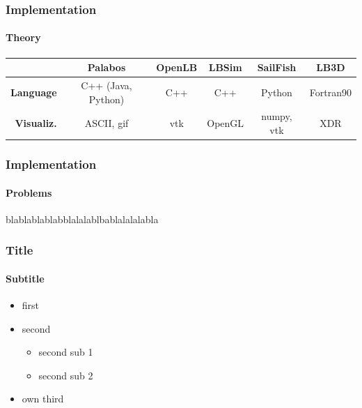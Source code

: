 \documentclass{beamer}
\begin{document}
\begin{frame}
\frametitle{Implementation}
\framesubtitle{Theory}
\scriptsize

\begin{table}[ht!]
\flushleft
\begin{tabular}{r|ccccc}
 & \bf Palabos & \bf OpenLB & \bf LBSim & \bf SailFish & \bf LB3D \\ \toprule
\bf Language &C++ (Java, Python) & C++ & C++ &Python &Fortran90 \\
\bf Visualiz.&ASCII, gif& vtk & OpenGL &numpy, vtk& XDR \\ \bottomrule
\end{tabular}
\end{table}

\end{frame}



\begin{frame}
\frametitle{Implementation}
\framesubtitle{Problems}
blablablablabblalalablbablalalalabla
\end{frame}



\begin{frame}
\frametitle{Title}
\framesubtitle{Subtitle}

\begin{itemize}
\item first
\item second
\begin{itemize}
\item second sub 1
\item second sub 2
\end{itemize}
\item own third
\end{itemize}
\end{frame}
\end{document}
